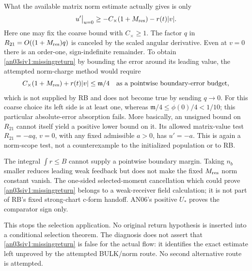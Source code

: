 \documentclass[11pt]{article}
\numberwithin{equation}{section}
\theoremstyle{remark}\newtheorem{remark}[proposition]{Remark}
\begin{document}
What the available matrix norm estimate actually gives is only
\begin{equation}
 u'\big|_{u=0}\ge-C_\times(1+M_{\rm res})-r(t)|v|.
 \label{an03siv1:normfailure}
\end{equation}
Here one may fix the coarse bound with $C_\times\ge1$.
The factor $q$ in $R_{21}=O((1+M_{\rm res})q)$ is canceled by
the scaled angular derivative. Even at $v=0$ there is an
order-one, sign-indefinite remainder. To obtain
\eqref{an03siv1:missingreturn} by bounding the error around its
leading value, the attempted norm-charge method would require
\begin{equation}
 C_\times(1+M_{\rm res})+r(t)|v|
          \le\mathfrak m/4
 \quad\text{as a pointwise boundary-error budget},
 \label{an03siv1:failedabsorption}
\end{equation}
which is not supplied by RB and does not become true by sending
$q\to0$. For this coarse choice its left side is at least one,
whereas $\mathfrak m/4\le\phi(0)/4<1/10$; this particular
absolute-error absorption fails. More basically, an unsigned bound on $R_{21}$ cannot
itself yield a positive lower bound on it. Its allowed matrix-value
test $R_{21}=-a q$, $v=0$, with any fixed admissible $a>0$,
has $u'=-a$. This is again a norm-scope test, not a counterexample
to the initialized population or to RB.

The integral $\int r\le B$ cannot supply a pointwise boundary
margin. Taking $n_b$ smaller reduces leading weak feedback but
does not make the fixed $M_{\rm res}$ norm constant vanish.
The one-sided selected-moment cancellation which could prove
\eqref{an03siv1:missingreturn} belongs to a weak-receiver field
calculation; it is not part of RB's fixed strong-chart c-form
handoff. AN06's positive $U_*$ proves the comparator sign only.

This stops the selection application. No original return hypothesis
is inserted into a conditional selection theorem. The diagnosis
does not assert that \eqref{an03siv1:missingreturn} is false for the
actual flow: it identifies the exact estimate left unproved by the
attempted BULK/norm route. No second alternative route is attempted.
\end{document}
